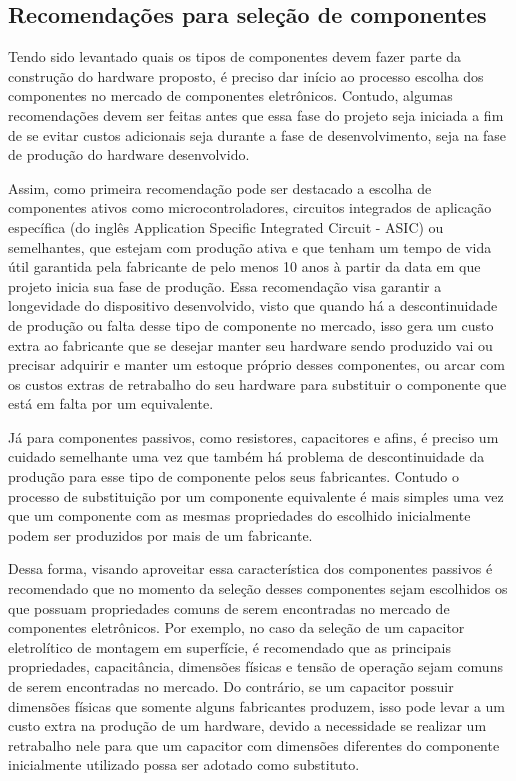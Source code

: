 \subsection{Recomendações para seleção de componentes}\label{subsec:recomendacoes_componentes}

Tendo sido levantado quais os tipos de componentes devem fazer parte da construção do hardware proposto, é preciso dar início ao processo escolha dos componentes no mercado de componentes eletrônicos. Contudo, algumas recomendações devem ser feitas antes que essa fase do projeto seja iniciada a fim de se evitar custos adicionais seja durante a fase de desenvolvimento, seja na fase de produção do hardware desenvolvido. 

Assim, como primeira recomendação pode ser destacado a escolha de componentes ativos como microcontroladores,  circuitos integrados de aplicação específica (do inglês Application Specific Integrated Circuit - ASIC) ou semelhantes, que estejam com produção ativa e que tenham um tempo de vida útil garantida pela fabricante de pelo menos 10 anos à partir da data em que projeto inicia sua fase de produção. Essa recomendação visa garantir a longevidade do dispositivo desenvolvido, visto que quando há a descontinuidade de produção ou falta desse tipo de componente no mercado, isso gera um custo extra ao fabricante que se desejar manter seu hardware sendo produzido vai ou precisar adquirir e manter um estoque próprio desses componentes, ou arcar com os custos extras de retrabalho do seu hardware para substituir o componente que está em falta por um equivalente. 

Já para componentes passivos, como resistores, capacitores e afins, é preciso um cuidado semelhante uma vez que também há problema de descontinuidade da produção para esse tipo de componente pelos seus fabricantes. Contudo o processo de substituição por um componente equivalente é mais simples uma vez que um componente com as mesmas propriedades do escolhido inicialmente podem ser produzidos por mais de um fabricante. 

Dessa forma, visando aproveitar essa característica dos componentes passivos é recomendado que no momento da seleção desses componentes sejam escolhidos os que possuam propriedades comuns de serem encontradas no mercado de componentes eletrônicos. Por exemplo, no caso da seleção de um capacitor eletrolítico de montagem em superfície, é recomendado que as principais propriedades, capacitância, dimensões físicas e tensão de operação sejam comuns de serem encontradas no mercado. Do contrário, se um capacitor possuir dimensões físicas que somente alguns fabricantes produzem, isso pode levar a um custo extra na produção de um hardware, devido a necessidade se realizar um retrabalho nele para que um capacitor com dimensões diferentes do componente inicialmente utilizado possa ser adotado como substituto. 

